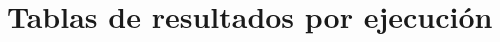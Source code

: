 \documentclass[a4paper,11pt]{book}
\begin{document}


\tableofcontents
\listoffigures
\listoftables
%







%
%
%
%
%
%
%
%
%
%
%
%
%
%
%
%
%
%
\newpage
% 
\printbibliography
% 
% 
%
%
\appendix
\chapter{Tablas de resultados por ejecución}

\newpage

%
%
\end{document}
